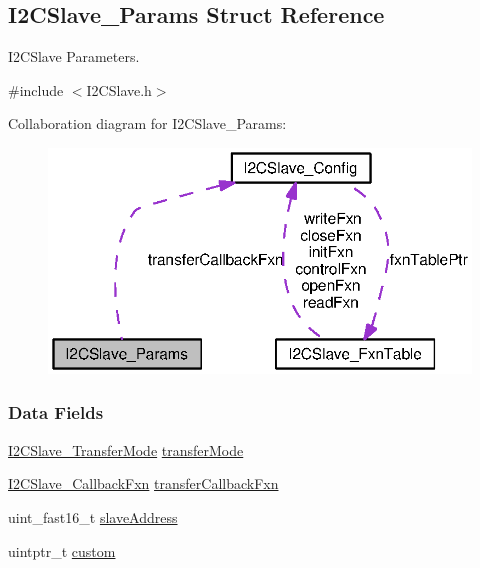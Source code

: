\subsection{I2\+C\+Slave\+\_\+\+Params Struct Reference}
\label{struct_i2_c_slave___params}


I2\+C\+Slave Parameters.  




{\ttfamily \#include $<$I2\+C\+Slave.\+h$>$}



Collaboration diagram for I2\+C\+Slave\+\_\+\+Params\+:
\nopagebreak
\begin{figure}[H]
\begin{center}
\leavevmode
\includegraphics[width=321pt]{struct_i2_c_slave___params__coll__graph}
\end{center}
\end{figure}
\subsubsection*{Data Fields}
\begin{DoxyCompactItemize}
\item 
\hyperlink{_i2_c_slave_8h_a5e27f9ba25088f9e7071e3e6f806559d}{I2\+C\+Slave\+\_\+\+Transfer\+Mode} \hyperlink{struct_i2_c_slave___params_a51c76c5694cd3a9e9102b9273cfe4a7f}{transfer\+Mode}
\item 
\hyperlink{_i2_c_slave_8h_a2f0d1d9022a0668ad78e7ff37298d24a}{I2\+C\+Slave\+\_\+\+Callback\+Fxn} \hyperlink{struct_i2_c_slave___params_afed4d41de559f2ba40d23c0b597db7b8}{transfer\+Callback\+Fxn}
\item 
uint\+\_\+fast16\+\_\+t \hyperlink{struct_i2_c_slave___params_a9e0bbedf3facf43bb3c56aba78749774}{slave\+Address}
\item 
uintptr\+\_\+t \hyperlink{struct_i2_c_slave___params_a2e32cd085c51ad9fb6bf32c4d51a69e5}{custom}
\end{DoxyCompactItemize}


